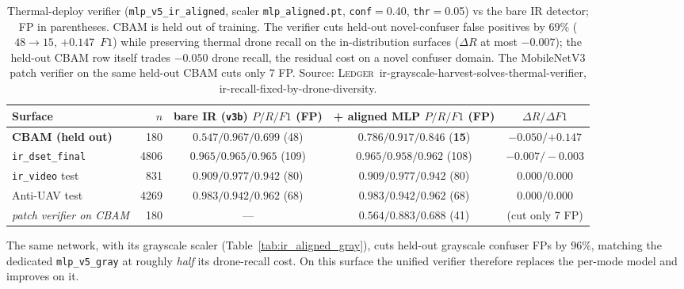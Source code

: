 \begin{table}[htbp]
    \centering
    \caption{Thermal-deploy verifier (\texttt{mlp\_v5\_ir\_aligned}, scaler \texttt{mlp\_aligned.pt}, \texttt{conf}$=$0.40, \texttt{thr}$=$0.05) vs the bare IR detector; FP in parentheses. CBAM is held out of training. The verifier cuts held-out novel-confuser false positives by $69\%$ ($48\to15$, $+0.147$~$F1$) while preserving thermal drone recall on the in-distribution surfaces ($\Delta R$ at most $-0.007$); the held-out CBAM row itself trades $-0.050$ drone recall, the residual cost on a novel confuser domain. The MobileNetV3 patch verifier on the same held-out CBAM cuts only $7$ FP. Source: \textsc{Ledger}~ir-grayscale-harvest-solves-thermal-verifier, ir-recall-fixed-by-drone-diversity.}
    \label{tab:ir_aligned}
    \begin{tabular}{lrccc}
        \toprule
        Surface & $n$ & bare IR (\texttt{v3b}) $P/R/F1$ (FP) & + aligned MLP $P/R/F1$ (FP) & $\Delta R / \Delta F1$ \\
        \midrule
        \textbf{CBAM (held out)}  & 180  & $0.547/0.967/0.699$ (48) & $\mathbf{0.786/0.917/0.846}$ (\textbf{15}) & $-0.050 / \mathbf{+0.147}$ \\
        \texttt{ir\_dset\_final}  & 4806 & $0.965/0.965/0.965$ (109) & $0.965/0.958/0.962$ (108) & $-0.007 / -0.003$ \\
        \texttt{ir\_video} test   & 831  & $0.909/0.977/0.942$ (80) & $0.909/0.977/0.942$ (80) & $0.000 / 0.000$ \\
        Anti-UAV test             & 4269 & $0.983/0.942/0.962$ (68) & $0.983/0.942/0.962$ (68) & $0.000 / 0.000$ \\
        \midrule
        \emph{patch verifier on CBAM} & 180 & --- & $0.564/0.883/0.688$ (41) & (cut only 7 FP) \\
        \bottomrule
    \end{tabular}
\end{table}

The same network, with its grayscale scaler (Table~\ref{tab:ir_aligned_gray}), cuts held-out grayscale confuser FPs by $96\%$, matching the dedicated \texttt{mlp\_v5\_gray} at roughly \emph{half} its drone-recall cost. On this surface the unified verifier therefore replaces the per-mode model and improves on it.


